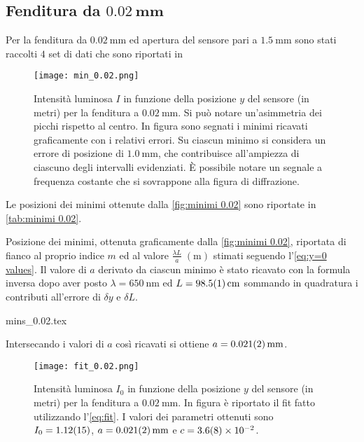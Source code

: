 \documentclass[../main.tex]{subfiles}
\begin{document}
\subsection{Fenditura da $\mathbf{\qty{0.02}{\mm}}$}

Per la fenditura da $\qty{0.02}{\mm}$ ed apertura del sensore pari a $\qty{1.5}{\mm}$ sono stati raccolti $4$ set di dati che sono riportati in %

\begin{figure}[ht!]
    \centering
    \texttt{[image: min\_0.02.png]}
    \caption{Intensità luminosa $I$ in funzione della posizione $y$ del sensore (in metri) per la fenditura a $\qty{0.02}{\milli\metre}$. Si può notare un'asimmetria dei picchi  rispetto al centro. In figura sono segnati i minimi ricavati graficamente con i relativi errori. Su ciascun minimo si considera un errore di posizione di $\qty{1.0}{\mm}$, che contribuisce all'ampiezza di ciascuno degli intervalli evidenziati. È possibile notare un segnale a frequenza costante che si sovrappone alla figura di diffrazione.} %
    \label{fig:minimi 0.02}
\end{figure}

Le posizioni dei minimi ottenute dalla \autoref{fig:minimi 0.02} sono riportate in \autoref{tab:minimi 0.02}.

\begin{table}[ht!]
    \centering
    \caption{Posizione dei minimi, ottenuta graficamente dalla \autoref{fig:minimi 0.02}, riportata di fianco al proprio indice $m$ ed al valore $\frac{\lambda L}{a} \; (\si{\metre})$ stimati seguendo l'\autoref{eq:y=0 values}. Il valore di $a$ derivato da ciascun minimo è stato ricavato con la formula inversa dopo aver posto $\lambda = \qty{650}{\nm}$ ed $L = \qty{98.5+-0.1}{\cm}$ sommando in quadratura i contributi all'errore di $\delta y$ e $\delta L$.}
    {mins_0.02.tex}
    \label{tab:minimi 0.02}
\end{table}

Intersecando i valori di $a$ così ricavati si ottiene $a = \qty{0.021+-0.002}{\mm}$.


\begin{figure}[ht!]
    \centering
    \texttt{[image: fit\_0.02.png]}
    \caption{Intensità luminosa $I_{0}$ in funzione della posizione $y$ del sensore (in metri) per la fenditura a $\qty{0.02}{\mm}$. In figura è riportato il fit fatto utilizzando l'\autoref{eq:fit}. I valori dei parametri ottenuti sono $I_{0} = \num{1.12+-0.15}$, $a = \qty{0.021+-0.002}{\mm}$ e $c = \num{3.6+-0.8e-2}$.}
    \label{fig:fit 0.02}
\end{figure}
\end{document}
